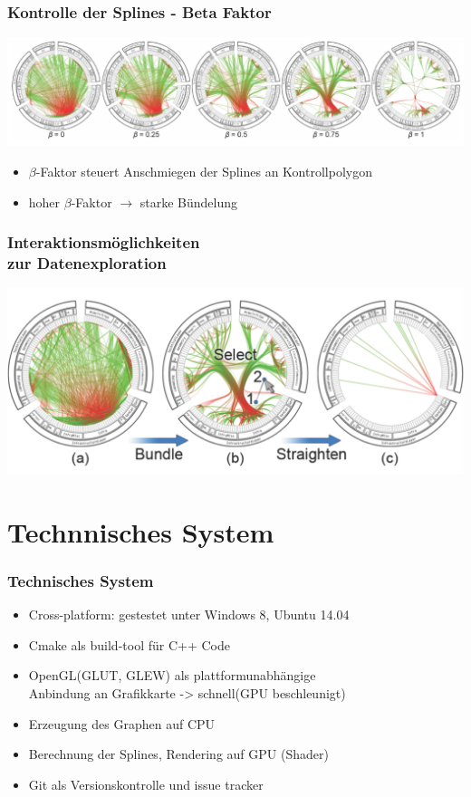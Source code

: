 \documentclass[11pt]{beamer}
\begin{document}
\begin{frame}
\frametitle{Kontrolle der Splines - Beta Faktor}
\includegraphics[scale=0.35]{./Algorithm_BetaFactor_Results.png}
\begin{itemize}
\bigskip
\item $\beta$-Faktor steuert Anschmiegen der Splines an Kontrollpolygon
\item hoher $\beta$-Faktor $\rightarrow$ starke Bündelung
\end{itemize}

\end{frame}

\begin{frame}
\frametitle{Interaktionsmöglichkeiten\\ zur Datenexploration}
\includegraphics[scale=0.30]{./Algorithm_Interaction.png}
\end{frame}

\section{Technnisches System}
\begin{frame}
\frametitle{Technisches System}

\begin{itemize}
\item Cross-platform: gestestet unter Windows 8, Ubuntu 14.04
\item Cmake als build-tool für C++ Code
\item OpenGL(GLUT, GLEW) als plattformunabhängige  
\\ Anbindung an Grafikkarte -> schnell(GPU beschleunigt) 
\item Erzeugung des Graphen auf CPU
\item Berechnung der Splines, Rendering auf GPU (Shader)
\item Git als Versionskontrolle und issue tracker
\end{itemize}

\end{frame}
\end{document}
